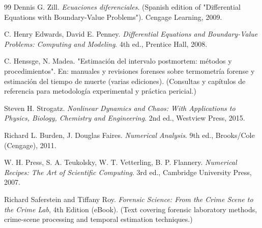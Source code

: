 \documentclass[a4paper,10pt]{article}
\begin{document}
\begin{thebibliography}{99}
	 Dennis G. Zill. \emph{Ecuaciones diferenciales}. (Spanish edition of
		"Differential Equations with Boundary-Value Problems"). Cengage Learning, 2009.

	 C. Henry Edwards, David E. Penney. \emph{Differential
		Equations and Boundary-Value Problems: Computing and Modeling}. 4th ed.,
		Prentice Hall, 2008.

	 C. Henssge, N. Madea. "Estimación del intervalo postmortem: métodos
		y procedimientos". En: manuales y revisiones forenses sobre termometría forense y
		estimación del tiempo de muerte (varias ediciones). (Consultas y capítulos de
		referencia para metodología experimental y práctica pericial.)

	 Steven H. Strogatz. \emph{Nonlinear Dynamics and Chaos: With Applications
		to Physics, Biology, Chemistry and Engineering}. 2nd ed., Westview Press, 2015.

	 Richard L. Burden, J. Douglas Faires. \emph{Numerical Analysis}. 9th ed.,
		Brooks/Cole (Cengage), 2011.

	 W. H. Press, S. A. Teukolsky, W. T. Vetterling, B. P. Flannery.
		\emph{Numerical Recipes: The Art of Scientific Computing}. 3rd ed., Cambridge
		University Press, 2007.

	 Richard Saferstein and Tiffany Roy. \emph{Forensic Science: From the Crime Scene to the Crime Lab}, 4th Edition (eBook).
		(Text covering forensic laboratory methods, crime-scene processing and temporal estimation techniques.)

\end{thebibliography}


\label{end}
\end{document}
